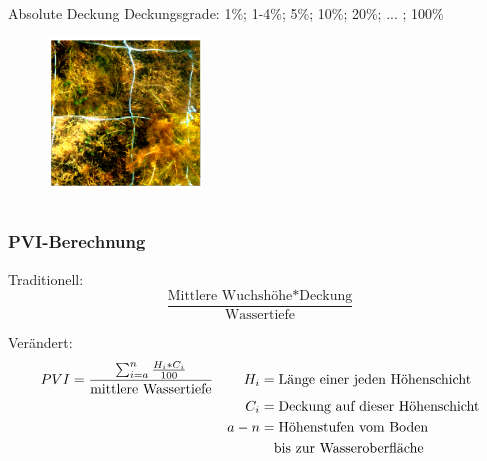 \documentclass{beamer}
\begin{document}
\begin{frame}
\begin{columns}
\begin{column}{5.5cm}
\begin{block}{Absolute Deckung}
Deckungsgrade: 
1\%; 1-4\%; 5\%; 10\%; 20\%; ... ; 100\% 
\end{block}
\begin{figure}
\includegraphics[height=40mm]{images/plotpictures/V+M.png}
\end{figure}
\end{column}
\end{columns}
\end{frame}

\begin{frame}
\frametitle{PVI-Berechnung}
\begin{block}{Traditionell:}
\begin{equation*}
\frac{\text{Mittlere Wuchshöhe} * \text{Deckung}}{\text{Wassertiefe}}
\end{equation*}
\end{block}
\pause
\begin{block}{Verändert:}
\begin{align*}
 PVI &=\frac{\sum_{i=a}^n \frac{H_i * C_i}{100}}{\text{mittlere Wassertiefe}} & H_i &=\text{Länge einer jeden Höhenschicht}\\ 
 & & C_i &=\text{Deckung auf dieser Höhenschicht}\\
 & & a-n &=\text{Höhenstufen vom Boden}\\
 & &     &\text{\quad bis zur Wasseroberfläche}\\
\end{align*}
\end{block}
\end{frame}
\end{document}
